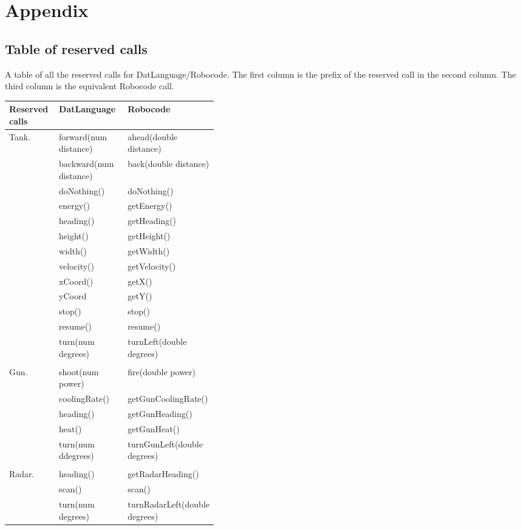 \chapter{Appendix}
\section{Table of reserved calls}
\label{ResCall}
A table of all the reserved calls for DatLanguage/Robocode. The first column is the prefix of the reserved call in the second column. The third column is the equivalent Robocode call. 

\begin{center}
    \begin{tabular}{ | l| l | p{0.4\linewidth} | }
	\hline
    Reserved calls & DatLanguage & Robocode \\ \hline
    Tank. & forward(num distance) & ahead(double distance)  \\ \hline
     & backward(num distance) & back(double distance)  \\ \hline
     & doNothing() & doNothing() \\ \hline
     & energy() & getEnergy() \\ \hline
     & heading() & getHeading() \\ \hline
     & height() & getHeight() \\ \hline
     & width() & getWidth()  \\ \hline
     & velocity() & getVelocity()  \\ \hline
     & xCoord() & getX() \\ \hline
     & yCoord & getY() \\ \hline
     & stop() & stop() \\ \hline
     & resume() & resume() \\ \hline
     & turn(num degrees) & turnLeft(double degrees)  \\ \hline
     & &  \\ \hline
    Gun. & shoot(num power) & fire(double power) \\ \hline
     & coolingRate() & getGunCoolingRate() \\ \hline
     & heading() & getGunHeading() \\ \hline
     & heat() & getGunHeat() \\ \hline
     & turn(num ddegrees) & turnGunLeft(double degrees)  \\ \hline
     & &  \\ \hline
    Radar. & heading() & getRadarHeading() \\ \hline
     & scan() & scan() \\ \hline
     & turn(num degrees) & turnRadarLeft(double degrees) \\ \hline
    \end{tabular}
\end{center} 
     
